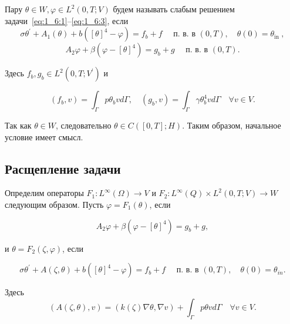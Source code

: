 \begin{definition}
    Пару $\theta \in W, \varphi \in L^{2}(0, T ; V)$ будем называть слабым
    решением задачи~\eqref{eq:1_6:1}--\eqref{eq:1_6:3}, если
    \begin{equation}
        \label{eq:1_6:4}
        \sigma \theta^{\prime}+A_{1}(\theta)+b\left([\theta]^{4}-\varphi\right)=f_{b}+f
        \quad \text { п. в. в }(0, T), \quad \theta(0)=\theta_{\text {in }},
    \end{equation}
    \begin{equation}
        \label{eq:1_6:5}
        A_{2} \varphi+\beta\left(\varphi-[\theta]^{4}\right)
        =g_{b}+g \quad \text { п. в. в }(0, T).
    \end{equation}
\end{definition}

Здесь $f_{b}, g_{b} \in L^{2}\left(0, T ; V^{\prime}\right)$ и

\[
    \left(f_{b}, v\right)=\int_{\Gamma} p \theta_{b} v d \Gamma,
    \quad\left(g_{b}, v\right)=
    \int_{\Gamma} \gamma \theta_{b}^{4} v d \Gamma \quad \forall v \in V.
\]

\begin{remark}
    Так как $\theta \in W$, следовательно $\theta \in C([0, T] ; H)$.
    Таким образом, начальное условие имеет смысл.
\end{remark}

\subsection{Расщепление задачи}
\label{subsec:ch1/sec5/subsec2}

Определим операторы $F_{1}: L^{\infty}(\Omega) \rightarrow V$ и
$F_{2}: L^{\infty}(Q) \times L^{2}(0, T ; V) \rightarrow W$ следующим образом.
Пусть $\varphi=F_{1}(\theta)$, если

\begin{equation}
    \label{eq:1_6:6}
    A_{2} \varphi+\beta\left(\varphi-[\theta]^{4}\right)=g_{b}+g,
\end{equation}

и $\theta=F_{2}(\zeta, \varphi)$, если

\begin{equation}
    \label{eq:1_6:7}
    \sigma \theta^{\prime}+A(\zeta, \theta)
    +b\left([\theta]^{4}-\varphi\right)=f_{b}+f
    \quad \text { п. в. в }(0, T), \quad \theta(0)=\theta_{i n}.
\end{equation}

Здесь
\[
    (A(\zeta, \theta), v)=(k(\zeta) \nabla \theta, \nabla v)
    +\int_{\Gamma} p \theta v d \Gamma \quad \forall v \in V.
\]

